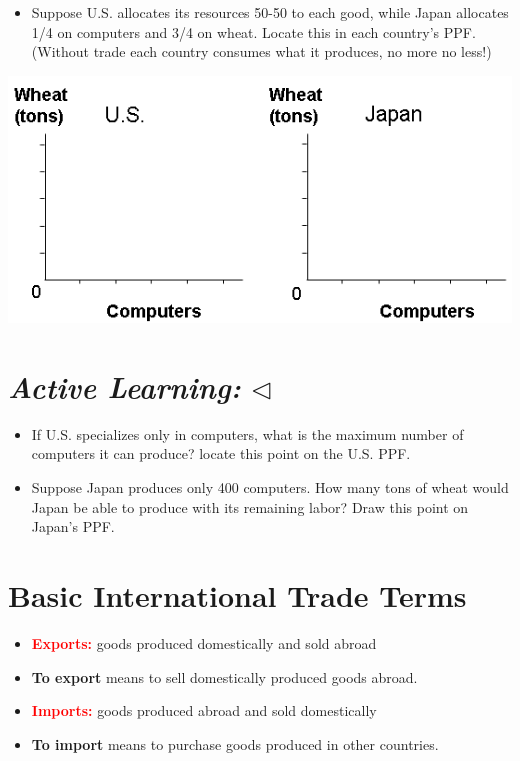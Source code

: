 \documentclass[
]{book}
\providecommand{\tightlist}{%
  \setlength{\itemsep}{0pt}\setlength{\parskip}{0pt}}
\begin{document}
\begin{itemize}
\tightlist
\item
  Suppose U.S. allocates its resources 50-50 to each good, while Japan allocates 1/4 on computers and 3/4 on wheat. Locate this in each country's PPF. (Without trade each country consumes what it produces, no more no less!)
\end{itemize}

\centering

\includegraphics[width=\textwidth,height=0.75\textheight]{images/lesson02/part2/page18.PNG}

\hypertarget{active-learning-triangleleft}{%
\section{\texorpdfstring{\emph{Active Learning:} \(\triangleleft\)}{Active Learning: \textbackslash triangleleft}}\label{active-learning-triangleleft}}

\begin{itemize}
\item
  If U.S. specializes only in computers, what is the maximum number of computers it can produce? locate this point on the U.S. PPF.
\item
  Suppose Japan produces only 400 computers. How many tons of wheat would Japan be able to produce with its remaining labor? Draw this point on Japan's PPF.
\end{itemize}

\hypertarget{basic-international-trade-terms}{%
\section{Basic International Trade Terms}\label{basic-international-trade-terms}}

\begin{itemize}
\item
  \textcolor{red}{\textbf{Exports: }} goods produced domestically and sold abroad
\item
  \textbf{To export} means to sell domestically produced goods abroad.
\item
  \textcolor{red}{\textbf{Imports: }} goods produced abroad and sold domestically
\item
  \textbf{To import} means to purchase goods produced in other countries.
\end{itemize}
\end{document}
